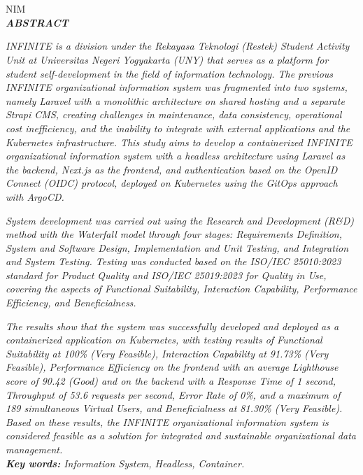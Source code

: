 
\clearpage
{}
{}
\begin{center}
    \textbf{\large{\judulen}}\\[2em]
    \penulis\\
    NIM \nim\\[2em]
    \textbf{\textit{ABSTRACT}}\\[0.5cm]
\end{center}

\textit{INFINITE is a division under the Rekayasa Teknologi (Restek) Student Activity Unit at Universitas Negeri Yogyakarta (UNY) that serves as a platform for student self-development in the field of information technology. The previous INFINITE organizational information system was fragmented into two systems, namely Laravel with a monolithic architecture on shared hosting and a separate Strapi CMS, creating challenges in maintenance, data consistency, operational cost inefficiency, and the inability to integrate with external applications and the Kubernetes infrastructure. This study aims to develop a containerized INFINITE organizational information system with a headless architecture using Laravel as the backend, Next.js as the frontend, and authentication based on the OpenID Connect (OIDC) protocol, deployed on Kubernetes using the GitOps approach with ArgoCD.}

\textit{System development was carried out using the Research and Development (R\&D) method with the Waterfall model through four stages: Requirements Definition, System and Software Design, Implementation and Unit Testing, and Integration and System Testing. Testing was conducted based on the ISO/IEC 25010:2023 standard for \textit{Product Quality} and ISO/IEC 25019:2023 for \textit{Quality in Use}, covering the aspects of Functional Suitability, Interaction Capability, Performance Efficiency, and Beneficialness.}

\textit{The results show that the system was successfully developed and deployed as a containerized application on Kubernetes, with testing results of Functional Suitability at 100\% (Very Feasible), Interaction Capability at 91.73\% (Very Feasible), Performance Efficiency on the frontend with an average Lighthouse score of 90.42 (Good) and on the backend with a Response Time of 1 second, Throughput of 53.6 requests per second, Error Rate of 0\%, and a maximum of 189 simultaneous Virtual Users, and Beneficialness at 81.30\% (Very Feasible). Based on these results, the INFINITE organizational information system is considered feasible as a solution for integrated and sustainable organizational data management.}\\[0.6cm]

\noindent \textit{\textbf{Key words:} Information System, Headless, Container.}
